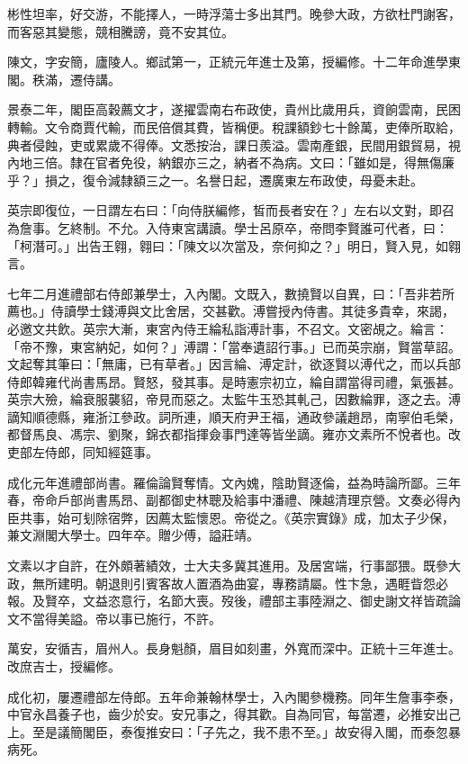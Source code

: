\begin{pinyinscope}
彬性坦率，好交游，不能擇人，一時浮蕩士多出其門。晚參大政，方欲杜門謝客，而客惡其變態，競相騰謗，竟不安其位。

陳文，字安簡，廬陵人。鄉試第一，正統元年進士及第，授編修。十二年命進學東閣。秩滿，遷侍講。

景泰二年，閣臣高穀薦文才，遂擢雲南右布政使，貴州比歲用兵，資餉雲南，民困轉輸。文令商賈代輸，而民倍償其費，皆稱便。稅課額鈔七十餘萬，吏俸所取給，典者侵蝕，吏或累歲不得俸。文悉按治，課日羨溢。雲南產銀，民間用銀貿易，視內地三倍。隸在官者免役，納銀亦三之，納者不為病。文曰：「雖如是，得無傷廉乎？」損之，復令減隸額三之一。名譽日起，遷廣東左布政使，母憂未赴。

英宗即復位，一日謂左右曰：「向侍朕編修，皙而長者安在？」左右以文對，即召為詹事。乞終制。不允。入侍東宮講讀。學士呂原卒，帝問李賢誰可代者，曰：「柯潛可。」出告王翱，翱曰：「陳文以次當及，奈何抑之？」明日，賢入見，如翱言。

七年二月進禮部右侍郎兼學士，入內閣。文既入，數撓賢以自異，曰：「吾非若所薦也。」侍讀學士錢溥與文比舍居，交甚歡。溥嘗授內侍書。其徒多貴幸，來謁，必邀文共飲。英宗大漸，東宮內侍王綸私詣溥計事，不召文。文密覘之。綸言：「帝不豫，東宮納妃，如何？」溥謂：「當奉遺詔行事。」已而英宗崩，賢當草詔。文起奪其筆曰：「無庸，已有草者。」因言綸、溥定計，欲逐賢以溥代之，而以兵部侍郎韓雍代尚書馬昂。賢怒，發其事。是時憲宗初立，綸自謂當得司禮，氣張甚。英宗大殮，綸衰服襲貂，帝見而惡之。太監牛玉恐其軋己，因數綸罪，逐之去。溥謫知順德縣，雍浙江參政。詞所連，順天府尹王福，通政參議趙昂，南寧伯毛榮，都督馬良、馮宗、劉聚，錦衣都指揮僉事門達等皆坐謫。雍亦文素所不悅者也。改吏部左侍郎，同知經筵事。

成化元年進禮部尚書。羅倫論賢奪情。文內媿，陰助賢逐倫，益為時論所鄙。三年春，帝命戶部尚書馬昂、副都御史林聰及給事中潘禮、陳越清理京營。文奏必得內臣共事，始可刬除宿弊，因薦太監懷恩。帝從之。《英宗實錄》成，加太子少保，兼文淵閣大學士。四年卒。贈少傅，謚莊靖。

文素以才自許，在外頗著績效，士大夫多冀其進用。及居宮端，行事鄙猥。既參大政，無所建明。朝退則引賓客故人置酒為曲宴，專務請屬。性卞急，遇睚眥怨必報。及賢卒，文益恣意行，名節大喪。歿後，禮部主事陸淵之、御史謝文祥皆疏論文不當得美謚。帝以事已施行，不許。

萬安，安循吉，眉州人。長身魁顏，眉目如刻畫，外寬而深中。正統十三年進士。改庶吉士，授編修。

成化初，屢遷禮部左侍郎。五年命兼翰林學士，入內閣參機務。同年生詹事李泰，中官永昌養子也，齒少於安。安兄事之，得其歡。自為同官，每當遷，必推安出己上。至是議簡閣臣，泰復推安曰：「子先之，我不患不至。」故安得入閣，而泰忽暴病死。


\end{pinyinscope}
